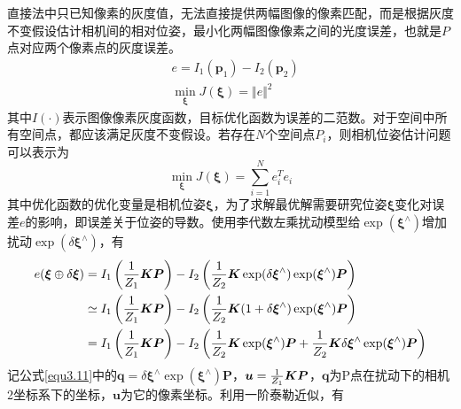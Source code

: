 直接法中只已知像素的灰度值，无法直接提供两幅图像的像素匹配，而是根据灰度不变假设估计相机间的相对位姿，最小化两幅图像像素之间的光度误差，也就是$P$点对应两个像素点的灰度误差。
\begin{equation}
\label{equ3.9}
\begin{aligned}
& e = I_1(\boldsymbol{p}_1) - I_2(\boldsymbol{p}_2) 
\\ 
& \min\limits_{\boldsymbol{\xi}} J(\boldsymbol{\xi}) = \Vert e \Vert ^2
\end{aligned}
\end{equation}
其中$I(\cdot)$表示图像像素灰度函数，目标优化函数为误差的二范数。对于空间中所有空间点，都应该满足灰度不变假设。若存在$N$个空间点$P_i$，则相机位姿估计问题可以表示为
\begin{equation}
\label{equ3.10}
\min\limits_{\boldsymbol{\xi}} J(\boldsymbol{\xi}) = \sum\limits_{i=1}^N e_i^T e_i
\end{equation}
其中优化函数的优化变量是相机位姿$\boldsymbol{\xi}$，为了求解最优解需要研究位姿$\boldsymbol{\xi}$变化对误差$e$的影响，即误差关于位姿的导数。使用李代数左乘扰动模型给$\exp(\boldsymbol{\xi}^{\wedge})$增加扰动$\exp( \delta \boldsymbol{\xi}^{\wedge})$，有
\begin{equation}
\label{equ3.11}
\begin{aligned}
e(\boldsymbol{\xi}\oplus \delta \boldsymbol{\xi}) & = I_1\left({1 \over Z_1} \boldsymbol{K} \boldsymbol{P} \right) - I_2\left({1 \over Z_2} \boldsymbol{K} \exp (\delta \boldsymbol{\xi}^{\wedge}) \exp (\boldsymbol{\xi}^{\wedge}) \boldsymbol{P} \right)
\\
& \simeq I_1\left( {1 \over Z_1} \boldsymbol{K} \boldsymbol{P} \right) - I_2 \left( {1 \over Z_2} \boldsymbol{K} (1+\delta \boldsymbol{\xi}^{\wedge}) \exp (\boldsymbol{\xi}^{\wedge}) \boldsymbol{P} \right)
\\
& = I_1\left( {1 \over Z_1} \boldsymbol{K} \boldsymbol{P} \right) - I_2 \left({1 \over Z_2} \boldsymbol{K} \exp (\boldsymbol{\xi}^{\wedge}) \boldsymbol{P}+ {1 \over Z_2} \boldsymbol{K} \delta \boldsymbol{\xi}^{\wedge} \exp (\boldsymbol{\xi}^{\wedge}) \boldsymbol{P} \right)
\end{aligned}
\end{equation}
记公式\eqref{equ3.11}中的$\boldsymbol{q} = \delta \boldsymbol{\xi}^{\wedge} \exp (\boldsymbol{\xi}^{\wedge}) \boldsymbol{P} $，$\boldsymbol{u}={1 \over Z_1} \boldsymbol{K} \boldsymbol{P}$，$\boldsymbol{q}$为P点在扰动下的相机2坐标系下的坐标，$\boldsymbol{u}$为它的像素坐标。利用一阶泰勒近似，有

